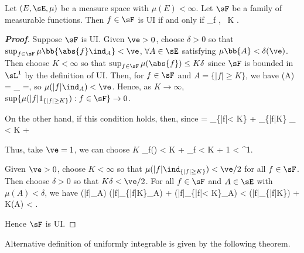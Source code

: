 \begin{lemma}\label{lem:uniformly_integrable_finite_measure}
Let $(E,\sE,\mu)$ be a measure space with $\mu(E)<\infty$. Let $\sF$ be a family of measurable functions. Then $f\in \sF$ is UI if and only if \be \sup_{f \in \sF} \mu{} ,
\quad {}\ K \to \infty. \ee
\end{lemma}

\begin{proof}[\bf Proof]
Suppose $\sF$ is UI. Given $\ve > 0$, choose $\delta > 0$ so that $\sup_{f\in \sF}\mu\bb{\abs{f}\ind_A} < \ve$, $\forall A\in \sE$ satisfying $\mu\bb{A} < \delta(\ve)$.
Then choose $K < \infty$ so that $\sup_{f\in \sF}\mu(\abs{f}) \leq K\delta$ since $\sF$ is bounded in $\sL^1$ by the definition of UI. Then, for $f\in \sF$ and $A = \{|f| \geq K\}$, we have
\be
\mu(A) = _{} \leq {} \leq {} =\delta,
\ee
so $\mu(|f|\ind_A) < \ve$. Hence, as $K \to \infty$, $\sup\{\mu(|f|1_{\{|f|\geq K\}}) : f\in \sF\} \to 0$.

On the other hand, if this condition holds, then, since
\beast
{} = \ind_{\{|f|< K\}} + \ind_{\{|f|\geq K\}} \quad \ra \quad {}_{} \quad \ra\quad \mu{} < K\mu{} + 
\eeast

Thus, take $\ve=1$, we can choose $K$ \be \sup_{f\in \sF}\mu() < K\mu{} + \sup_{f\in \sF} < K\mu{} + 1 < \infty\quad\ra\quad \sF {}\sL^1. \ee

Given $\ve > 0$, choose $K < \infty$ so that $\mu(|f|\ind_{\{|f|\geq K\}}) < \ve/2$ for all $f \in \sF$. Then choose $\delta > 0$ so that $K\delta < \ve/2$. For all $f \in \sF$ and $A \in \sE$ with
$\mu(A) < \delta$, we have \be \mu(|f|\ind_A) \leq \mu(|f|\ind_{\{|f|\geq K\}}\ind_A) + \mu(|f|\ind_{\{|f|< K\}}\ind_A) < \mu(|f|\ind_{\{|f|\geq K\}})  + K\mu(A) < \ve. \ee

Hence $\sF$ is UI.
\end{proof}

Alternative definition of uniformly integrable is given by the following theorem.

